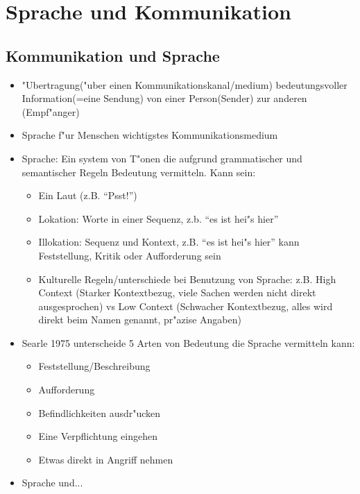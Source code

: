 \section{Sprache und Kommunikation}
\subsection{Kommunikation und Sprache}

\begin{itemize}
	\item
		"Ubertragung("uber einen Kommunikationskanal/medium) bedeutungsvoller Information(=eine Sendung) von einer Person(Sender) zur anderen (Empf"anger)
	\item
		Sprache f"ur Menschen wichtigstes Kommunikationsmedium
	\item
		Sprache: Ein system von T"onen die aufgrund grammatischer und semantischer Regeln Bedeutung vermitteln. Kann sein:
		\begin{itemize}
			\item
				Ein Laut (z.B. \enquote{Psst!})
			\item
				Lokation: Worte in einer Sequenz, z.b. \enquote{es ist hei"s hier}
			\item
				Illokation: Sequenz und Kontext, z.B. \enquote{es ist hei"s hier} kann Feststellung, Kritik oder Aufforderung sein
			\item
				Kulturelle Regeln/unterschiede bei Benutzung von Sprache: z.B. High Context (Starker Kontextbezug, viele Sachen werden nicht direkt ausgesprochen) vs Low Context (Schwacher Kontextbezug, alles wird direkt beim Namen genannt, pr"azise Angaben)
		\end{itemize}
	\item
		Searle 1975 unterscheide 5 Arten von Bedeutung die Sprache vermitteln kann:
		\begin{itemize}
			\item
				Feststellung/Beschreibung
			\item
				Aufforderung
			\item
				Befindlichkeiten ausdr"ucken
			\item
				Eine Verpflichtung eingehen
			\item
				Etwas direkt in Angriff nehmen
		\end{itemize}
	\item
		Sprache und...


\end{itemize}
